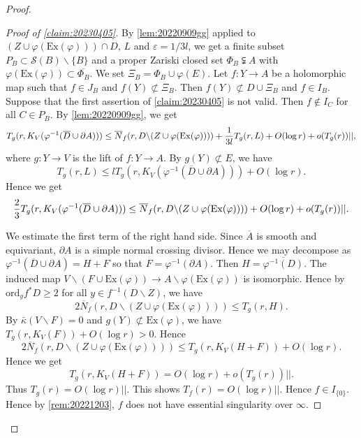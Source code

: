 \documentclass[10pt,a4paper]{amsart}
\begin{document}
\begin{proof}
\begin{proof}[Proof of \cref{claim:20230405}]
			
			
			By \cref{lem:20220909gg} applied to $(Z\cup \varphi (\mathrm{Ex}(\varphi)))\cap D$, $L$ and $\varepsilon=1/3l$, we get a finite subset $P_B\subset \mathcal{S}(B)\backslash\{B\}$ and a proper Zariski closed set $\Phi_B\subsetneqq A$ with $\varphi (\mathrm{Ex}(\varphi))\subset \overline{\Phi_B}$.
			We set $\Xi_B=\Phi_B\cup\varphi(E)$.
			Let $f:Y\to A$ be a holomorphic map such that $f\in J_B$ and $f(Y)\not\subset \Xi_B$.
			Then $ f(Y)\not\subset D\cup \Xi_B$ and $f\in I_B$.
			Suppose that the first assertion of \cref{claim:20230405} is not valid.
			Then $f\not\in I_C$ for all $C\in P_B$.
			By \cref{lem:20220909gg}, we get
			\begin{equation*}
				T_{g}(r,K_{V}(\varphi^{-1}(\overline{D}\cup \partial A)))
				\leq \overline{N}_{f}(r,D\backslash (Z\cup \varphi (\mathrm{Ex}(\varphi))))+\frac{1}{3l}T_{g}(r,L)
				\\
				+O(\log r)+o(T_{g}(r))||,
			\end{equation*}
			where $g:Y\to V$ is the lift of $ f:Y\to A$.
			By $g(Y)\not\subset E$, we have 
			$$
			T_{g}(r,L)\leq lT_{g}(r,K_{V}(\varphi^{-1}(\overline{D}\cup \partial A)))+O(\log r).
			$$
			Hence we get
			\begin{equation*}
				\frac{2}{3}T_{g}(r,K_{V}(\varphi^{-1}(\overline{D}\cup \partial A)))
				\leq \overline{N}_{f}(r,D\backslash (Z\cup \varphi (\mathrm{Ex}(\varphi))))
				\\
				+O(\log r)+o(T_{g}(r))||.
			\end{equation*}
			
			
			We estimate the first term of the right hand side.
			Since $\overline{A}$ is smooth and equivariant, $\partial A$ is a simple normal crossing divisor.
			Hence we may decompose as $\varphi^{-1}(\overline{D}\cup \partial A)=H+F$ so that $F=\varphi^{-1}(\partial A)$.
			Then $H=\overline{\varphi^{-1}(D)}$.
			The induced map $V\backslash (F\cup \mathrm{Ex}(\varphi))\to A\backslash \varphi(\mathrm{Ex}(\varphi))$ is isomorphic.
			Hence by $\mathrm{ord}_yf^*D\geq 2$ for all $y\in f^{-1}(D\backslash Z)$, we have
			$$
			2\overline{N}_{f}(r,D\backslash (Z\cup \varphi (\mathrm{Ex}(\varphi))))\leq T_g(r,H).
			$$
			By $\bar{\kappa}(V\backslash F)=0$ and $g(Y)\not\subset \mathrm{Ex}(\varphi)$, we have $T_g(r,K_V(F))+O(\log r)>0$.
			Hence
			$$
			2\overline{N}_{f}(r,D\backslash (Z\cup \varphi (\mathrm{Ex}(\varphi))))\leq T_g(r,K_V(H+F))+O(\log r).
			$$
			Hence we get
			$$
			T_{g}(r,K_{V}(H+F))=O(\log r)+o(T_{g}(r))||.
			$$ 	 	
			Thus $T_{g}(r)=O(\log r) ||$.
			This shows $T_{f}(r)=O(\log r) ||$. 
			Hence $f\in I_{\{0\}}$.
			Hence by \cref{rem:20221203}, $f$ does not have essential singularity over $\infty$.
		\end{proof}
		

\end{proof}
\end{document}
